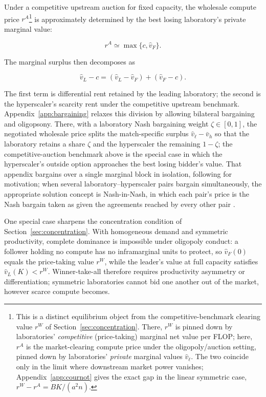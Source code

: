 \documentclass[11pt]{article}
\begin{document}
Under a competitive upstream auction for fixed capacity, the wholesale compute price $r^A$\footnote{This is a distinct equilibrium object from the competitive-benchmark clearing value $r^W$ of Section~\ref{sec:concentration}. There, $r^W$ is pinned down by laboratories' \emph{competitive} (price-taking) marginal net value per FLOP; here, $r^A$ is the market-clearing compute price under the oligopoly/auction setting, pinned down by laboratories' \emph{private} marginal values $\widehat v_\ell$. The two coincide only in the limit where downstream market power vanishes; Appendix~\ref{app:cournot} gives the exact gap in the linear symmetric case, $r^W-r^A=BK/(a^2 n)$.} is approximately determined by the best losing laboratory's private marginal value:

\begin{equation}r^A\simeq\max\{c,\widehat v_F\}.\end{equation}

The marginal surplus then decomposes as

\begin{equation}\widehat v_L-c=\left(\widehat v_L-\widehat v_F\right)+\left(\widehat v_F-c\right).\end{equation}

The first term is differential rent retained by the leading laboratory; the second is the hyperscaler's scarcity rent under the competitive upstream benchmark. Appendix~\ref{app:bargaining} relaxes this division by allowing bilateral bargaining and oligopsony. There, with a laboratory Nash bargaining weight $\zeta\in[0,1]$, the negotiated wholesale price splits the match-specific surplus $\widehat v_\ell-\bar v_h$ so that the laboratory retains a share $\zeta$ and the hyperscaler the remaining $1-\zeta$; the competitive-auction benchmark above is the special case in which the hyperscaler's outside option approaches the best losing bidder's value. That appendix bargains over a single marginal block in isolation, following \citet{hornWolinsky1988} for motivation; when several laboratory--hyperscaler pairs bargain simultaneously, the appropriate solution concept is Nash-in-Nash, in which each pair's price is the Nash bargain taken as given the agreements reached by every other pair \citep{collardWexlerEtAl2019}.

One special case sharpens the concentration condition of Section~\ref{sec:concentration}. With homogeneous demand and symmetric productivity, complete dominance is impossible under oligopoly conduct: a follower holding no compute has no inframarginal units to protect, so $\widehat v_F(0)$ equals the price-taking value $r^W$, while the leader's value at full capacity satisfies $\widehat v_L(K)<r^W$. Winner-take-all therefore requires productivity asymmetry or differentiation; symmetric laboratories cannot bid one another out of the market, however scarce compute becomes.
\end{document}

